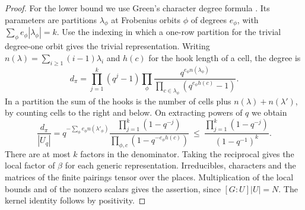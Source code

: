 \documentclass[a4paper,11pt]{article}
\theoremstyle{definition}
\theoremstyle{remark}
\numberwithin{equation}{section}
\begin{document}
\begin{proof}
For the lower bound we use Green's character degree formula
\cite{XVIII-XIII-green527}. Its parameters are partitions \(\lambda_\phi\)
at Frobenius orbits \(\phi\) of degrees \(e_\phi\), with
\(\sum_\phi e_\phi |\lambda_\phi|=k\).
Use the indexing in which a one-row partition for the trivial
degree-one orbit gives the trivial representation.
Writing \(n(\lambda)=\sum_{i\ge1}(i-1)\lambda_i\) and \(h(c)\)
for the hook length of a cell, the degree is
\[
  d_\pi=\prod_{j=1}^k(q^j-1)
       \prod_\phi \frac{q^{e_\phi n(\lambda_\phi)}}
           {\prod_{c\in\lambda_\phi}(q^{e_\phi h(c)}-1)} .
\]
In a partition the sum of the hooks is the number of cells plus
\(n(\lambda)+n(\lambda')\), by counting cells to the right and
below. On extracting powers of \(q\) we obtain
\[
 \frac{d_\pi}{|U_q|}
  =q^{-\sum_\phi e_\phi n(\lambda'_\phi)}
     \frac{\prod_{j=1}^k(1-q^{-j})}
          {\prod_{\phi,c}(1-q^{-e_\phi h(c)})}
  \ \le\ \frac{\prod_{j=1}^k(1-q^{-j})}{(1-q^{-1})^k}.
\]
There are at most \(k\) factors in the denominator. Taking the
reciprocal gives the local factor of \(\beta\) for each generic
representation. Irreducibles, characters and the matrices of the
finite pairings tensor over the places. Multiplication of the local
bounds and of the nonzero scalars gives the assertion, since
\([G:U]|U|=N\). The kernel identity follows by positivity.
\end{proof}
\end{document}
